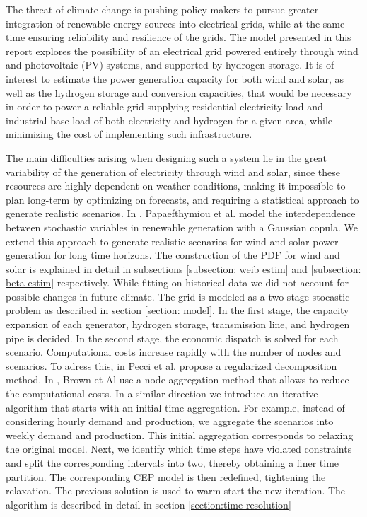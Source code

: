 \documentclass[english]{article}
\numberwithin{definition}{section}
\numberwithin{theorem}{section}
\numberwithin{problem}{section}
\begin{document}
The threat of climate change is pushing policy-makers to pursue greater integration of renewable energy sources into electrical grids, while at the same time ensuring reliability and resilience of the grids. The model presented in this report explores the possibility of an electrical grid powered entirely through wind and photovoltaic (PV) systems, and supported by hydrogen storage.
It is of interest to estimate the power generation capacity for both wind and solar, as well as the hydrogen storage and conversion capacities, that would be necessary in order to power a reliable grid supplying residential electricity load and industrial base load of both electricity and hydrogen for a given area, while minimizing the cost of implementing such infrastructure. 

The main difficulties arising when designing such a system lie in the great variability of the generation of electricity through wind and solar, since these resources are highly dependent on weather conditions, making it impossible to plan long-term by optimizing on forecasts, and requiring a statistical approach to generate realistic scenarios. In \cite{GaussCoupula}, Papaefthymiou et al. model the interdependence between stochastic variables in renewable generation with a Gaussian copula. We extend this approach to generate realistic scenarios for wind and solar power generation for long time horizons. 
 The construction of the PDF for wind and solar is explained in detail in subsections \ref{subsection: weib estim} and \ref{subsection: beta estim} respectively. 
 While fitting on historical data we did not account for possible changes in future climate.
 The grid is modeled as a  two stage stocastic problem  as described in section \ref{section: model}. 
 In the first stage, the capacity expansion of each generator, hydrogen storage, transmission line, 
 and hydrogen pipe is decided. In the second stage, the economic dispatch  is solved for each scenario.
Computational costs increase rapidly with the number of nodes and scenarios. To adress this, in \cite{pecci2024regularizedbendersdecompositionhigh} Pecci et al. propose a regularized decomposition method. In \cite*{HORSCH2018207}, Brown et Al use a node aggregation method that allows to reduce the computational costs. In a similar direction we introduce an iterative algorithm that starts with an initial time aggregation. For example, instead of considering hourly demand and production, we aggregate the scenarios into weekly demand and production. This initial aggregation corresponds to relaxing the original model. Next, we identify which time steps have violated constraints and split the corresponding intervals into two, thereby obtaining a finer time partition.
 The corresponding CEP model is then redefined, tightening the relaxation. The previous solution is used to warm start the new iteration. The algorithm is described in detail in section \ref{section:time-resolution}
 
\end{document}
